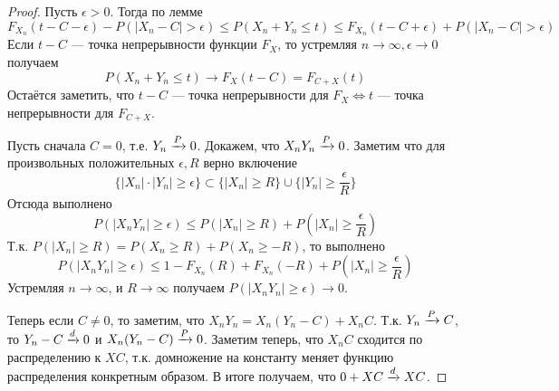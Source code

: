 \begin{proof}
    Пусть $\epsilon > 0$. Тогда по лемме
    \[
        F_{X_n}(t - C - \epsilon) - P(|X_n - C| > \epsilon) \leq P(X_n + Y_n \leq t) \leq F_{X_n}(t - C + \epsilon) + P(|X_n - C| > \epsilon)
    \]
    Если $t - C$ --- точка непрерывности функции $F_{X}$, то устремляя $n \to \infty, \epsilon \to 0$ получаем
    \[
        P(X_n + Y_n \leq t) \to F_{X}(t - C) = F_{C + X}(t)
    \]
    Остаётся заметить, что $t - C$ --- точка непрерывности для $F_X \iff t$ --- точка непрерывности для
    $F_{C + X}$.

    Пусть сначала $C = 0$, т.е. $Y_n \xrightarrow{P} 0$. Докажем, что $X_n Y_n \xrightarrow{P} 0$. Заметим что для произвольных положительных
    $\epsilon, R$ верно включение
    \[
        \{|X_n|\cdot|Y_n| \geq \epsilon\} \subset \{|X_n| \geq R\} \cup \{|Y_n| \geq \frac{\epsilon}{R}\}
    \]
    Отсюда выполнено
    \[
        P(|X_n Y_n| \geq \epsilon) \leq P(|X_n| \geq R) + P(|X_n| \geq \frac{\epsilon}{R})
    \]
    Т.к. $P(|X_n| \geq R) = P(X_n \geq R) + P(X_n \geq -R)$, то выполнено
    \[
        P(|X_n Y_n| \geq \epsilon) \leq 1 - F_{X_n}(R) + F_{X_n}(-R) + P(|X_n| \geq \frac{\epsilon}{R})
    \]
    Устремляя $n \to \infty$, и $R \to \infty$ получаем $P(|X_n Y_n| \geq \epsilon) \to 0$.

    Теперь если $C \neq 0$, то заметим, что $X_n Y_n = X_n(Y_n - C) + X_{n}C$. Т.к. $Y_n \xrightarrow{P} C$, то
    $Y_n - C \xrightarrow{d} 0$ и $X_n(Y_n - C) \xrightarrow{P} 0$. Заметим теперь, что $X_{n}C$ сходится по распределению к
    $XC$, т.к. домножение на константу меняет функцию распределения конкретным образом. В итоге получаем,
    что $0 + XC \xrightarrow{d} XC$.
\end{proof}


